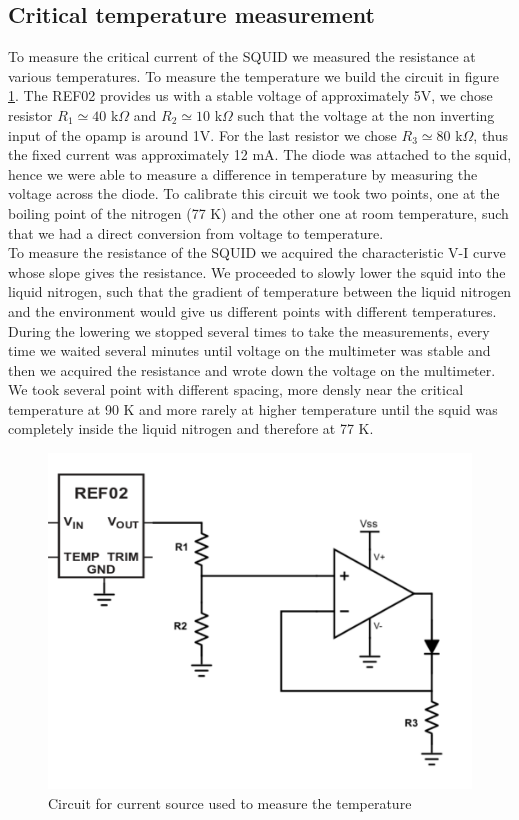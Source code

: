 \documentclass[a4paper,10pt]{article}
\begin{document}
\subsection{Critical temperature measurement}
To measure the critical current of the SQUID we measured the resistance at various temperatures. To measure the temperature we build the circuit in figure \ref{circuit}. The REF02 provides us with a stable voltage of approximately 5V, we chose resistor $R_1 \simeq 40$ k$\Omega$ and $R_2 \simeq 10$ k$\Omega$ such that the voltage at the non inverting input of the opamp is around 1V. For the last resistor  we chose $R_3 \simeq 80$ k$\Omega$, thus the fixed current was approximately 12 mA. The diode was attached to the squid, hence we were able to measure a difference in temperature by measuring the voltage across the diode. To calibrate this circuit we took two points, one at the boiling point of the nitrogen (77 K) and the other one at room temperature, such that we had a direct conversion from voltage to temperature.\\
To measure the resistance of the SQUID we acquired the characteristic V-I curve whose slope gives the resistance. We proceeded to slowly lower the squid into the liquid nitrogen, such that the gradient of temperature between the liquid nitrogen and the environment would give us different points with different temperatures. During the lowering we stopped several times to take the measurements, every time we waited several minutes until voltage on the multimeter was stable and then we acquired the resistance and wrote down the voltage on the multimeter.
We took several point with different spacing, more densly near the critical temperature at 90 K and more rarely at higher temperature until the squid was completely inside the liquid nitrogen and therefore at 77 K.
\begin{figure}[H]
\centering
\includegraphics[width = .5\textwidth]{circuit}
\caption{Circuit for current source used to measure the temperature}\label{circuit}
\end{figure}
\end{document}
